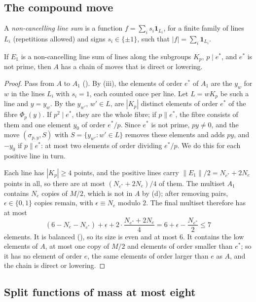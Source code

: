\subsection{The compound move}
A \emph{non-cancelling line sum} is a function $f=\sum_{i}s_{i}\mathbf
1_{L_{i}}$, for a finite family of lines $L_{i}$ (repetitions allowed) and
signs $s_{i}\in\{\pm1\}$, such that $|f|=\sum_{i}\mathbf 1_{L_{i}}$.

\begin{lemma}\label{lem:linesum}
If $E_{1}$ is a non-cancelling line sum of lines along the subgroups $K_{p}$,
$p\mid e^{*}$, and $e^{*}$ is not prime, then $A$ has a chain of moves that
is direct or lowering.
\end{lemma}

\begin{proof}
Pass from $A$ to $A_{1}$ (). By (iii), the
elements of order $e^{*}$ of $A_{1}$ are the $y_{w}$ for $w$ in the lines
$L_{i}$ with $s_{i}=1$, each counted once per line. Let $L=wK_{p}$ be such a
line and $y=y_{w}$. By  the $y_{w'}$, $w'\in L$, are
$|K_{p}|$ distinct elements of order $e^{*}$ of the fibre $\Phi_{p}(y)$. If
$p^{2}\mid e^{*}$, they are the whole fibre; if $p\parallel e^{*}$, the fibre
consists of them and one element $y_{0}$ of order $e^{*}/p$. Since $e^{*}$ is
not prime, $py\ne0$, and the move $(\sigma_{p,y},S)$ with $S=\{y_{w'}:w'\in
L\}$ removes these elements and adds $py$, and $-y_{0}$ if $p\parallel e^{*}$:
at most two elements of order dividing $e^{*}/p$. We do this for each positive
line in turn.

Each line has $|K_{p}|\ge4$ points, and the positive lines carry
$\|E_{1}\|/2=N_{e^{*}}+2N_{e}$ points in all, so there are at most
$(N_{e^{*}}+2N_{e})/4$ of them. The multiset $A_{1}$ contains $N_{e}$ copies
of $M/2$, which is not in $A$ by (d); after removing pairs,
$\epsilon\in\{0,1\}$ copies remain, with $\epsilon\equiv N_{e}$ modulo $2$.
The final multiset therefore has at most
\[
  (6-N_{e}-N_{e^{*}})+\epsilon+2\cdot\frac{N_{e^{*}}+2N_{e}}{4}
  =6+\epsilon-\frac{N_{e^{*}}}{2}\le7
\]
elements. It is balanced (), so its size is even and at most
$6$. It contains the low elements of $A$, at most one copy of $M/2$ and
elements of order smaller than $e^{*}$; so it has no element of order $e$,
the same elements of order larger than $e$ as $A$, and the chain is direct or
lowering.
\end{proof}

\subsection{Split functions of mass at most eight}

